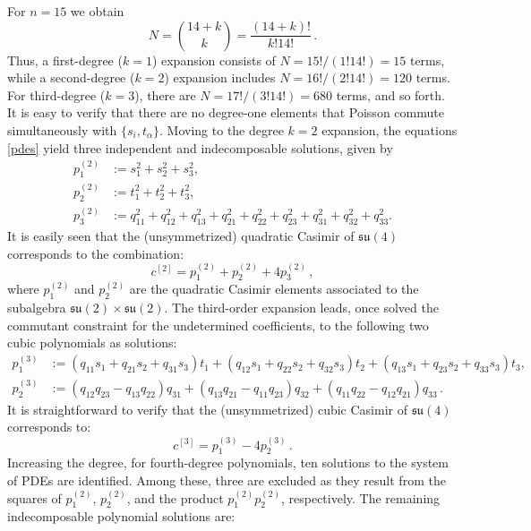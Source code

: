 \documentclass[10pt]{amsart}
\theoremstyle{definition}
\theoremstyle{corollary}
\theoremstyle{remark}
\theoremstyle{conclusion}
\begin{document}
For $ n=15$ we obtain 
\begin{equation}
N=\binom{14+k}{k}=\frac{(14+k)!}{k!14!} \, .
\end{equation}
Thus, a first-degree ($k=1$) expansion consists of $N=15!/(1!14!)=15$ terms, while a second-degree ($k=2$) expansion includes $N=16!/(2!14!)=120$ terms. For third-degree ($k=3$), there are $N=17!/(3!14!)=680$ terms, and so forth.  It is easy to verify that there are no degree-one elements that Poisson commute simultaneously with $\{s_i, t_\alpha\}$. Moving to the degree $k=2$ expansion, the equations \eqref{pdes} yield three independent and indecomposable solutions, given by 
\begin{equation}
\begin{split}
p_1^{(2)}&:=s_1^2 + s_2^2 + s_3^2, \\
p_2^{(2)}&:=t_{1}^2 + t_{2}^2 + t_{3}^2 ,\\
p_3^{(2)}&:=q_{11}^2+q_{12}^2+q_{13}^2+q_{21}^2+q_{22}^2+q_{23}^2+q_{31}^2+q_{32}^2+q_{33}^2 .
\end{split}
\end{equation}
It is easily seen that the (unsymmetrized) quadratic Casimir of $\mathfrak{su}(4)$ corresponds to the combination:
\begin{equation}
c^{[2]}=p_1^{(2)}+p_2^{(2)}+4 p_3^{(2)} \, ,
\end{equation}
where $p_1^{(2)}$ and $p_2^{(2)}$ are the quadratic Casimir elements associated to the subalgebra $\mathfrak{su}(2) \times \mathfrak{su}(2)$. The third-order expansion leads, once solved the commutant constraint for the undetermined coefficients, to the following two cubic polynomials as solutions:
\begin{equation}
\begin{split}
p_1^{(3)}&:=(q_{11} s_1  + q_{21} s_2 + q_{31} s_3) t_1 + (q_{12} s_1  + q_{22} s_2  + 
q_{32} s_3) t_2 + (q_{13} s_1  + q_{23} s_2  + q_{33} s_3) t_3 ,\\
p_2^{(3)}&:=(q_{12} q_{23}  - q_{13} q_{22}) q_{31} + (q_{13} q_{21}  - q_{11} q_{23}) q_{32} + (q_{11} q_{22}  - 
q_{12} q_{21}) q_{33}  \, . 
\end{split}
\end{equation}
It is straightforward to verify that the (unsymmetrized) cubic Casimir of $\mathfrak{su}(4)$ corresponds to:
\begin{equation}
c^{[3]}=p_1^{(3)}-4 p_2^{(3)} \, .
\end{equation} 
Increasing the degree, for fourth-degree polynomials, ten solutions to the system of PDEs are identified. Among these, three are excluded as they result from the squares of $p_1^{(2)}$, $p_2^{(2)}$, and the product $p_1^{(2)} p_2^{(2)}$, respectively. The remaining indecomposable polynomial solutions are:
\end{document}
